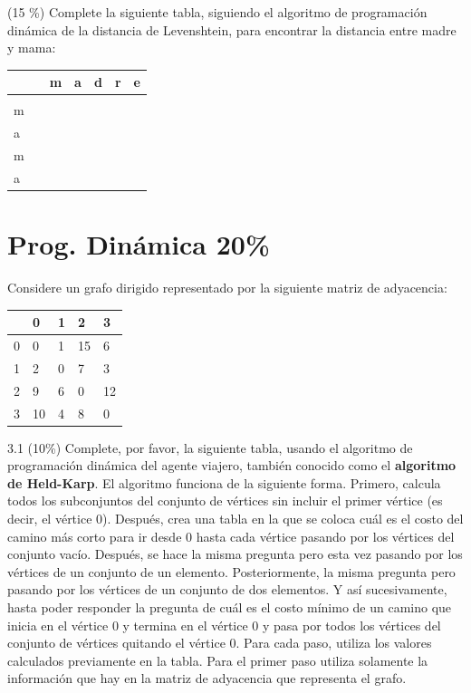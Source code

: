 \documentclass[twocolumn]{article}
\begin{document}

(15 \%) Complete la siguiente tabla, siguiendo el algoritmo de programación dinámica de la distancia de Levenshtein, para encontrar
la distancia entre madre y mama:\\

\begin{tabular}{| l  | l  | l  | l  | l  | l  | l |}
\hline
  & & m & a & d & r & e \\
 \hline
  & &  &  &  &  &  \\
  \hline
m & &  &  &  &  &  \\
\hline
a & &  &  &  &  &  \\
\hline
m & &  &  &  &  &  \\
\hline
a & &  &  &  &  &  \\
\hline
\end{tabular}


\section{Prog. Dinámica 20\%}
Considere un grafo dirigido representado por la siguiente matriz de adyacencia:

\begin{tabular}{|l|l|l|l|l|}
\hline
& 0 & 1 & 2 & 3 \\
\hline
0 & 0 & 1 & 15 & 6 \\
\hline
1 & 2 & 0 & 7 & 3 \\
\hline
2 & 9 & 6 & 0 & 12 \\
\hline
3 & 10 & 4 & 8 & 0 \\
\hline
\end{tabular}

3.1 (10\%) Complete, por favor, la siguiente tabla, usando el algoritmo de programación dinámica del agente viajero, también conocido como el
\textbf{algoritmo de Held-Karp}. El algoritmo funciona de la siguiente forma.
Primero, calcula todos los subconjuntos del conjunto de vértices sin incluir el primer vértice (es decir, el vértice $0$).
Después, crea una tabla en la que se coloca cuál es el costo del camino más
corto para ir desde $0$ hasta cada vértice pasando por los vértices del conjunto vacío.
Después, se hace la misma pregunta pero esta vez pasando por los vértices de un conjunto de un elemento.
Posteriormente, la misma pregunta pero pasando por los vértices de un conjunto de dos elementos.
Y así sucesivamente, hasta poder responder la pregunta de cuál es el costo mínimo de un camino que inicia
en el vértice $0$ y termina en el vértice $0$ y pasa por todos los vértices
del conjunto de vértices quitando el vértice $0$. Para cada paso, utiliza los valores
calculados previamente en la tabla. Para el primer paso utiliza solamente la información
que hay en la matriz de adyacencia que representa el grafo.
\end{document}
